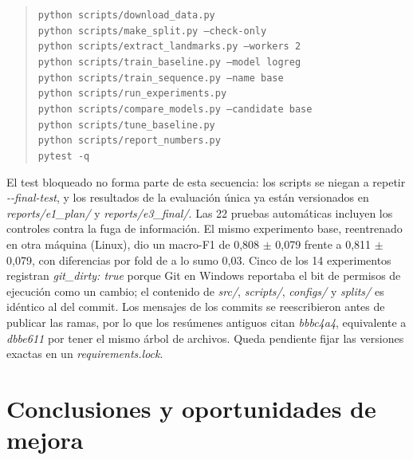 \documentclass[11pt,a4paper]{article}
\newcommand{\code}[1]{\textit{#1}}
\begin{document}
\noindent\begin{minipage}{\textwidth}\begin{quote}\small
\texttt{python scripts/download\_data.py}\\
\texttt{python scripts/make\_split.py --check-only}\\
\texttt{python scripts/extract\_landmarks.py --workers 2}\\
\texttt{python scripts/train\_baseline.py --model logreg}\\
\texttt{python scripts/train\_sequence.py --name base}\\
\texttt{python scripts/run\_experiments.py}\\
\texttt{python scripts/compare\_models.py --candidate base}\\
\texttt{python scripts/tune\_baseline.py}\\
\texttt{python scripts/report\_numbers.py}\\
\texttt{pytest -q}
\end{quote}\end{minipage}


El test bloqueado no forma parte de esta secuencia: los scripts se niegan a repetir \code{-{}-final-test}, y los resultados de la evaluación única ya están versionados en \code{reports/e1\_plan/} y \code{reports/e3\_final/}. Las 22 pruebas automáticas incluyen los controles contra la fuga de información. El mismo experimento base, reentrenado en otra máquina (Linux), dio un macro-F1 de 0,808 $\pm$ 0,079 frente a 0,811 $\pm$ 0,079, con diferencias por fold de a lo sumo 0,03. Cinco de los 14 experimentos registran \code{git\_dirty: true} porque Git en Windows reportaba el bit de permisos de ejecución como un cambio; el contenido de \code{src/}, \code{scripts/}, \code{configs/} y \code{splits/} es idéntico al del commit. Los mensajes de los commits se reescribieron antes de publicar las ramas, por lo que los resúmenes antiguos citan \code{bbbc4a4}, equivalente a \code{dbbe611} por tener el mismo árbol de archivos. Queda pendiente fijar las versiones exactas en un \code{requirements.lock}.

\section{Conclusiones y oportunidades de mejora}
\end{document}
